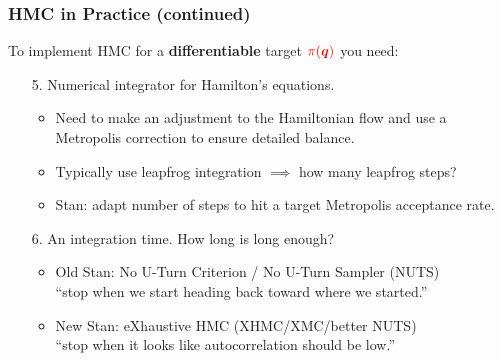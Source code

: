 \documentclass[xcolor=dvipsnames]{beamer}
\begin{document}
\begin{frame}
\frametitle{HMC in Practice (continued)}
To implement HMC for a \textbf{differentiable} target ${\color{red}\pi(\bm{q})}$ you need:
\vspace{0.2cm}
\begin{enumerate}
\item[5.] Numerical integrator for Hamilton's equations.
\begin{itemize}
\item Need to make an adjustment to the Hamiltonian flow and use a Metropolis correction to ensure detailed balance.
\vspace{0.2cm}
\item Typically use leapfrog integration $\implies$ how many leapfrog steps?
\vspace{0.2cm}
\item Stan: adapt number of steps to hit a target Metropolis acceptance rate.
\end{itemize}
\vspace{0.2cm}
\item[6.] An integration time. How long is long enough?
\begin{itemize}
\item Old Stan: No U-Turn Criterion / No U-Turn Sampler (NUTS) \\
\vspace{0.2cm}
``stop when we start heading back toward where we started.''
\vspace{0.2cm}
\item New Stan: eXhaustive HMC (XHMC/XMC/better NUTS) \\
\vspace{0.2cm}
``stop when it looks like autocorrelation should be low.''
\vspace{0.2cm}
\end{itemize}
\end{enumerate}
\end{frame}
\end{document}
